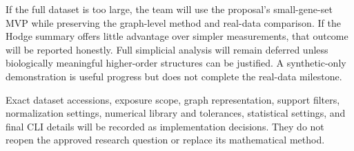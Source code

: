 If the full dataset is too large, the team will use the proposal's small-gene-set
MVP while preserving the graph-level method and real-data comparison. If the
Hodge summary offers little advantage over simpler measurements, that outcome
will be reported honestly. Full simplicial analysis will remain deferred unless
biologically meaningful higher-order structures can be justified. A synthetic-only
demonstration is useful progress but does not complete the real-data milestone.

Exact dataset accessions, exposure scope, graph representation, support filters,
normalization settings, numerical library and tolerances, statistical settings,
and final CLI details will be recorded as implementation decisions. They do not
reopen the approved research question or replace its mathematical method.

